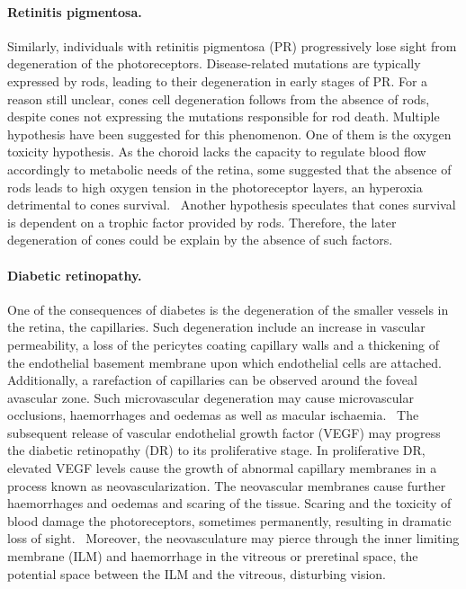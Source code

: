 \documentclass{article}
\begin{document}
\paragraph*{Retinitis pigmentosa.}
Similarly, individuals with retinitis pigmentosa (PR) progressively lose sight from degeneration of the photoreceptors.
Disease-related mutations are typically expressed by rods, leading to their degeneration in early stages of PR.
For a reason still unclear, cones cell degeneration follows from the absence of rods, despite cones not expressing the mutations responsible for rod death.
Multiple hypothesis have been suggested for this phenomenon.
One of them is the oxygen toxicity hypothesis.
As the choroid lacks the capacity to regulate blood flow accordingly to metabolic needs of the retina, some suggested that the absence of rods leads to high oxygen tension in the photoreceptor layers, an hyperoxia detrimental to cones survival.~\cite{Roberts_2018,Stone_1999}
Another hypothesis speculates that cones survival is dependent on a trophic factor provided by rods.
Therefore, the later degeneration of cones could be explain by the absence of such factors.~\cite{Roberts_2022}\\

\paragraph*{Diabetic retinopathy.}
One of the consequences of diabetes is the degeneration of the smaller vessels in the retina, the capillaries.
Such degeneration include an increase in vascular permeability, a loss of the pericytes coating capillary walls and a thickening of the endothelial basement membrane upon which endothelial cells are attached.~\cite{Medina_2016}
Additionally, a rarefaction of capillaries can be observed around the foveal avascular zone.
Such microvascular degeneration may cause microvascular occlusions, haemorrhages and oedemas as well as macular ischaemia.~\cite{Medina_2016}
The subsequent release of vascular endothelial growth factor (VEGF) may progress the diabetic retinopathy (DR) to its proliferative stage.
In proliferative DR, elevated VEGF levels cause the growth of abnormal capillary membranes in a process known as neovascularization.
The neovascular membranes cause further haemorrhages and oedemas and scaring of the tissue.
Scaring and the toxicity of blood damage the photoreceptors, sometimes permanently, resulting in dramatic loss of sight.~\cite{Friedlander_2007,Gupta_2015}
Moreover, the neovasculature may pierce through the inner limiting membrane (ILM) and haemorrhage in the vitreous or preretinal space, the potential space between the ILM and the vitreous, disturbing vision.\\
\end{document}
